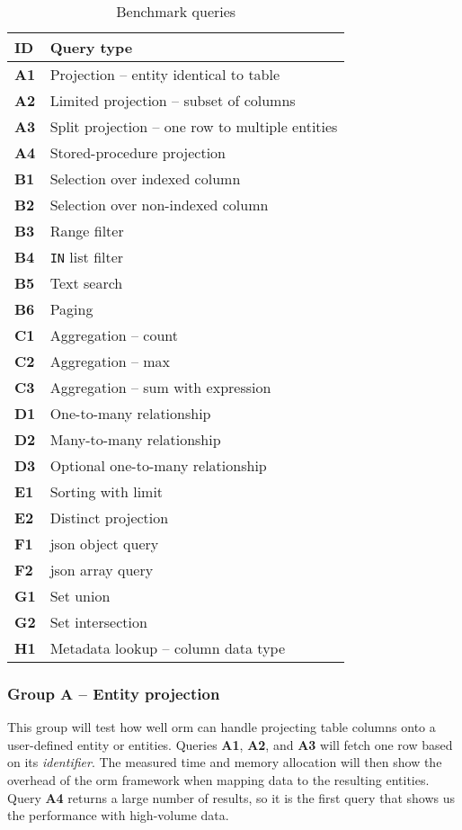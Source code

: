 \begin{table}[th]
\centering
\caption{Benchmark queries}\label{tab:queries-sum}
\begin{tabular}{ll}
\toprule
\textbf{ID} & \textbf{Query type} \\ 
\midrule
\textbf{A1} & Projection -- entity identical to table \\ 
\textbf{A2} & Limited projection -- subset of columns \\ 
\textbf{A3} & Split projection -- one row to multiple entities \\ 
\textbf{A4} & Stored-procedure projection \\ 
\textbf{B1} & Selection over indexed column \\ 
\textbf{B2} & Selection over non-indexed column \\ 
\textbf{B3} & Range filter \\ 
\textbf{B4} & \texttt{IN} list filter \\ 
\textbf{B5} & Text search \\ 
\textbf{B6} & Paging \\ 
\textbf{C1} & Aggregation -- count \\ 
\textbf{C2} & Aggregation -- max \\ 
\textbf{C3} & Aggregation -- sum with expression \\ 
\textbf{D1} & One-to-many relationship\\ 
\textbf{D2} & Many-to-many relationship \\ 
\textbf{D3} & Optional one-to-many relationship \\ 
\textbf{E1} & Sorting with limit \\ 
\textbf{E2} & Distinct projection \\ 
\textbf{F1} & \acrshort{json} object query \\ 
\textbf{F2} & \acrshort{json} array query \\ 
\textbf{G1} & Set union\\ 
\textbf{G2} & Set intersection \\ 
\textbf{H1} & Metadata lookup -- column data type \\ 
\bottomrule
\end{tabular}
\end{table}

\subsubsection{Group A -- Entity projection}
This group will test how well \acrshort{orm} can handle projecting table columns onto a user-defined entity or entities. Queries \textbf{A1}, \textbf{A2}, and \textbf{A3} will fetch one row based on its \textit{identifier}. The measured time and memory allocation will then show the overhead of the \acrshort{orm} framework when mapping data to the resulting entities. Query \textbf{A4} returns a large number of results, so it is the first query that shows us the performance with high-volume data.

